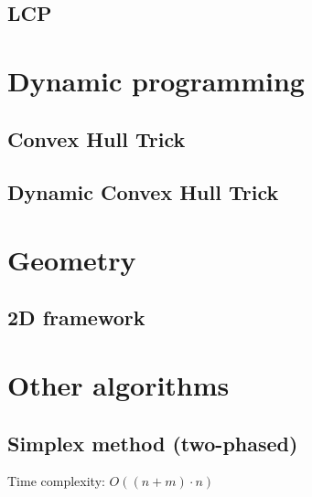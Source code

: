 \documentclass[12pt]{article}
\begin{document}
\subsection{LCP}
\section{Dynamic programming}
\subsection{Convex Hull Trick}

\subsection{Dynamic Convex Hull Trick}

\section{Geometry}
\subsection{2D framework}

\section{Other algorithms}
\subsection{Simplex method (two-phased)}
Time complexity: $O((n + m) \cdot n)$

\end{document}
